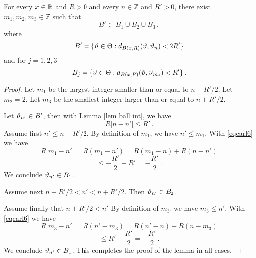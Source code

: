 \begin{lemma}\label{lem tdb1}
    For every $x\in \mathbb{R}$ and $R>0$ and every
    $n\in \mathbb{Z}$ and $R'>0$,
    there exist $m_1, m_2, m_3\in \mathbb{Z}$
    such that
    \begin{equation}\label{eqcarl5}
        B'\subset B_1\cup B_2\cup B_3\, ,
    \end{equation}
where
\begin{equation}
B'=     \{ \vartheta \in \Theta: d_{B(x,R)}(\vartheta, \vartheta_n)<2R'\}
\end{equation}
and for $j=1,2,3$
\begin{equation}
    B_j=
        \{ \vartheta \in \Theta: d_{B(x,R)}(\vartheta, \vartheta_{m_j})<R'\}
        \, .
\end{equation}

\end{lemma}
\begin{proof}
Let $m_1$ be the largest integer smaller than
or equal to
$n-R'/2$.
Let $m_2=2$.
Let $m_3$ be the smallest integer larger than
or equal to $n+R'/2$.

Let $\vartheta_{n'}\in B'$, then with Lemma \ref{lem ball int},
we have
\begin{equation}\label{eqcarl6}
    R|n-n'|\le R'\, .
\end{equation}
Assume first $n'\le n-R'/2$. By definition of $m_1$,
we have $n'\le m_1$.  With \eqref{eqcarl6}
we have
\begin{equation*}
    R|m_1-n'|=R(m_1-n')=R(m_1-n)+R(n-n')
\end{equation*}
\begin{equation}
    \le -\frac{R'}2+R'=-\frac{R'}2\, .
\end{equation}
We conclude $\vartheta_{n'}\in B_1$.

Assume next  $n-R'/2<n'<n+R'/2$. Then
$\vartheta_{n'}\in B_2$.

Assume finally that $n+R'/2<n'$
By definition of $m_3$,
we have $m_3\le n'$.  With \eqref{eqcarl6}
we have
\begin{equation*}
    R|m_3-n'|=R(n'-m_3)=R(n'-n)+R(n-m_3)
\end{equation*}
\begin{equation}
    \le R' -\frac{R'}2=-\frac{R'}2\, .
\end{equation}
We conclude $\vartheta_{n'}\in B_1$.
This completes the proof of the lemma in all cases.
\end{proof}

